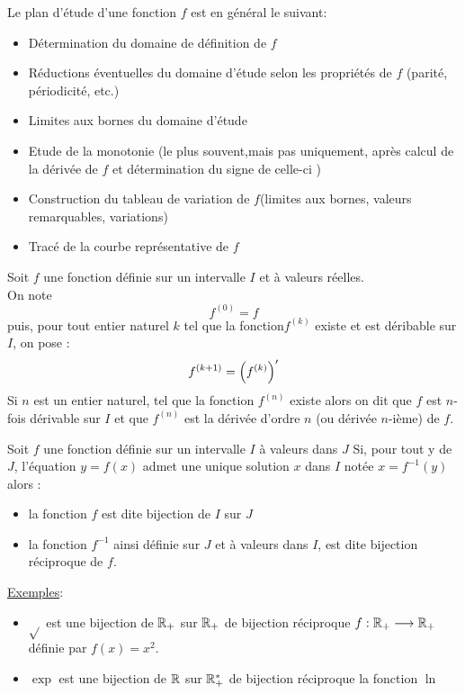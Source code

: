 \begin{defprop}
	Le plan d'étude d'une fonction \(f\) est en général le suivant:
	\begin{itemize}
		\item Détermination du domaine de définition de \(f\)
		\item Réductions éventuelles du domaine d'étude selon les propriétés de \(f\) (parité, périodicité, etc.)
		\item Limites aux bornes du domaine d'étude
		\item Etude de la monotonie (le plus souvent,mais pas uniquement, après calcul de la dérivée de \(f\) et détermination du signe de celle-ci )
		\item Construction du tableau de variation de \(f\)(limites aux bornes, valeurs remarquables, variations)
		\item Tracé de la courbe représentative de \(f\)
	\end{itemize}
\end{defprop}
\begin{defprop}
	Soit \(f\) une fonction définie sur un intervalle \(I\) et à valeurs réelles. \\
	On note
	\[f^{(0)} = f\]
	puis, pour tout entier naturel \(k\) tel que la fonction\(f^{(k)}\) existe et est déribable sur \(I\), on pose :
	\[f^{(k+1)} = \left(f^{(k)}\right)'\]
	Si \(n\) est un entier naturel, tel que la fonction \(f^{(n)}\) existe alors on dit que \(f\) est \(n\)-fois dérivable sur \(I\) et que \(f^{(n)}\) est la dérivée d'ordre \(n\) (ou dérivée \(n\)-ième) de \(f\).\\

\end{defprop}
\begin{defi}
	Soit \(f\) une fonction définie sur un intervalle \(I\) à valeurs dans \(J\)
	Si, pour tout y de \(J\), l’équation \(y = f(x)\) admet une unique solution \(x\) dans \(I\) notée \(x = f^{-1}(y)\) alors :
	\begin{itemize}
		\item la fonction \(f\) est dite bijection de \(I\) sur \(J\)
		\item la fonction \(f^{-1}\) ainsi définie sur \(J\) et à valeurs dans \(I\), est dite bijection réciproque de \(f\).
	\end{itemize}
	\underline{Exemples}:
	\begin{itemize}
		\item \(\sqrt{}\) est une bijection de \(\mathbb{R}_+\) sur \(\mathbb{R}_+\) de bijection réciproque \(f : \mathbb{R}_+ \longrightarrow \mathbb{R}_+\) définie par \(f(x) = x^2\).
		\item \(\exp\) est une bijection de \(\mathbb{R}\) sur \(\mathbb{R}_+^*\) de bijection réciproque la fonction \(\ln\)
	\end{itemize}
\end{defi}
